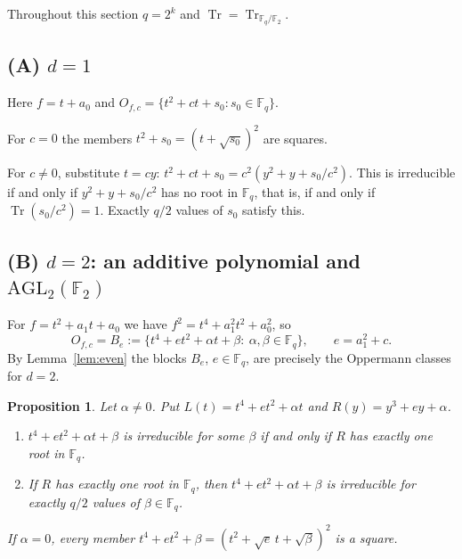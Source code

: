 \documentclass[11pt,a4paper]{amsart}
\newtheorem{proposition}[theorem]{Proposition}
\theoremstyle{definition}
\theoremstyle{remark}
\newcommand{\F}{\mathbb{F}}
\newcommand{\Tr}{\operatorname{Tr}}
\newcommand{\AGL}{\mathrm{AGL}}
\begin{document}
Throughout this section $q=2^k$ and $\Tr=\Tr_{\F_q/\F_2}$.

\subsection{\texorpdfstring{(A) $d=1$}{(A) d=1}}
Here $f=t+a_0$ and $O_{f,c}=\{t^2+ct+s_0:s_0\in\F_q\}$.

For $c=0$ the members $t^2+s_0=(t+\sqrt{s_0})^2$ are squares.

For $c\ne0$, substitute $t=cy$: $t^2+ct+s_0=c^2(y^2+y+s_0/c^2)$. This is irreducible if and only if
$y^2+y+s_0/c^2$ has no root in $\F_q$, that is, if and only if $\Tr(s_0/c^2)=1$. Exactly $q/2$ values of $s_0$
satisfy this.

\subsection{\texorpdfstring{(B) $d=2$: an additive polynomial and $\AGL_2(\F_2)$}{(B) d=2: an additive polynomial and AGL(2,2)}}
For $f=t^2+a_1t+a_0$ we have $f^2=t^4+a_1^2t^2+a_0^2$, so
\[
O_{f,c}=B_e:=\{t^4+et^2+\alpha t+\beta:\ \alpha,\beta\in\F_q\},\qquad e=a_1^2+c .
\]
By Lemma~\ref{lem:even} the blocks $B_e$, $e\in\F_q$, are precisely the Oppermann classes for $d=2$.

\begin{proposition}\label{prop:agl}
Let $\alpha\ne0$. Put $L(t)=t^4+et^2+\alpha t$ and $R(y)=y^3+ey+\alpha$.
\begin{enumerate}
\item $t^4+et^2+\alpha t+\beta$ is irreducible for some $\beta$ if and only if $R$ has exactly one root in $\F_q$.
\item If $R$ has exactly one root in $\F_q$, then $t^4+et^2+\alpha t+\beta$ is irreducible for exactly $q/2$ values of
$\beta\in\F_q$.
\end{enumerate}
If $\alpha=0$, every member $t^4+et^2+\beta=(t^2+\sqrt e\,t+\sqrt\beta)^2$ is a square.
\end{proposition}
\end{document}
